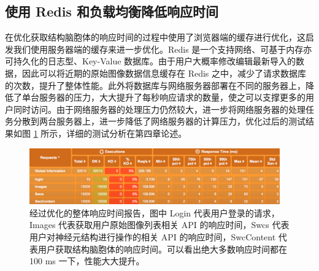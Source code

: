 \subsection{使用 Redis  和负载均衡降低响应时间}
在优化获取结构脑胞体的响应时间的过程中使用了浏览器端的缓存进行优化，这启发我们使用服务器端的缓存来进一步优化。Redis 是一个支持网络、可基于内存亦可持久化的日志型、Key-Value 数据库。由于用户大概率修改编辑最新导入的数据，因此可以将近期的原始图像数据信息缓存在 Redis 之中，减少了请求数据库的次数，提升了整体性能。此外将数据库与网络服务器部署在不同的服务器上，降低了单台服务器的压力，大大提升了每秒响应请求的数量，使之可以支撑更多的用户同时访问。由于网络服务器的处理压力仍然较大，进一步将网络服务器的处理任务分散到两台服务器上，进一步降低了网络服务器的计算压力，优化过后的测试结果如图 \ref{opt} 所示，详细的测试分析在第四章论述。

\begin{figure}
\centering
\includegraphics[width=108mm]{images/opt}
\caption{经过优化的整体响应时间报告，图中 Login 代表用户登录的请求， Images 代表获取用户原始图像列表相关 API 的响应时间，Swcs 代表用户对神经元结构进行操作的相关 API 的响应时间，SwcContent 代表用户获取结构脑胞体的响应时间。可以看出绝大多数响应时间都在 100 ms 一下，性能大大提升。}
\label{opt}
\end{figure}